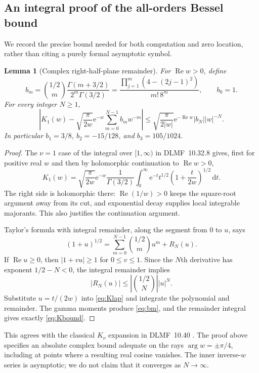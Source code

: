 \documentclass[11pt,a4paper]{article}
\newtheorem{lemma}[theorem]{Lemma}
\theoremstyle{definition}
\theoremstyle{remark}
\newcommand{\dd}{\,\mathrm d}
\newcommand{\e}{\mathrm e}
\newcommand{\Rea}{\operatorname{Re}}
\numberwithin{equation}{section}
\begin{document}
\subsection{An integral proof of the all-orders Bessel bound}
We record the precise bound needed for both computation and zero location, rather than citing a purely formal asymptotic symbol.

\begin{lemma}[Complex right-half-plane remainder]\label{lem:bessel}
For $\Rea w>0$, define
\begin{equation}\label{eq:bm}
 b_m=\binom{1/2}{m}\frac{\Gamma(m+3/2)}{2^m\Gamma(3/2)}
 =\frac{\prod_{j=1}^m(4-(2j-1)^2)}{m!\,8^m},\qquad b_0=1.
\end{equation}
For every integer $N\ge1$,
\begin{equation}\label{eq:Kbound}
 \left|K_1(w)-\sqrt{\frac\pi{2w}}\e^{-w}
       \sum_{m=0}^{N-1}b_mw^{-m}\right|
 \le\sqrt{\frac\pi{2|w|}}\e^{-\Rea w}|b_N||w|^{-N}.
\end{equation}
In particular $b_1=3/8$, $b_2=-15/128$, and $b_3=105/1024$.
\end{lemma}
\begin{proof}
The $\nu=1$ case of the integral over $[1,\infty)$ in DLMF~10.32.8 gives, first for positive real $w$ and then by holomorphic continuation to $\Rea w>0$,
\begin{equation}\label{eq:Klap}
 K_1(w)=\sqrt{\frac\pi{2w}}\e^{-w}
 \frac1{\Gamma(3/2)}\int_0^\infty
       \e^{-t}t^{1/2}\left(1+\frac{t}{2w}\right)^{1/2}\dd t.
\end{equation}
The right side is holomorphic there: $\Rea(1/w)>0$ keeps the square-root argument away from its cut, and exponential decay supplies local integrable majorants. This also justifies the continuation argument.

Taylor's formula with integral remainder, along the segment from $0$ to $u$, says
\[
 (1+u)^{1/2}=\sum_{m=0}^{N-1}\binom{1/2}{m}u^m+R_N(u).
\]
If $\Rea u\ge0$, then $|1+vu|\ge1$ for $0\le v\le1$. Since the $N$th derivative has exponent $1/2-N<0$, the integral remainder implies
\[
 |R_N(u)|\le\left|\binom{1/2}{N}\right||u|^N.
\]
Substitute $u=t/(2w)$ into \eqref{eq:Klap} and integrate the polynomial and remainder. The gamma moments produce \eqref{eq:bm}, and the remainder integral gives exactly \eqref{eq:Kbound}.
\end{proof}

This agrees with the classical $K_\nu$ expansion in DLMF~10.40 \cite{dlmf-asympt}. The proof above specifies an absolute complex bound adequate on the rays $\arg w=\pm\pi/4$, including at points where a resulting real cosine vanishes. The inner inverse-$w$ series is asymptotic; we do not claim that it converges as $N\to\infty$.
\end{document}
